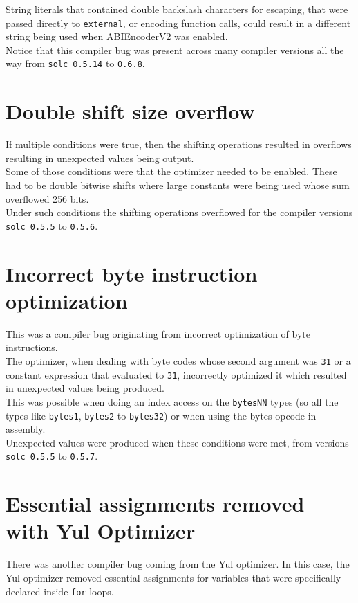 String literals that contained double backslash characters for escaping, that were passed directly to \texttt{external}, or encoding function calls, could result in a different string being used when ABIEncoderV2 was enabled. \\

Notice that this compiler bug was present across many compiler versions all the way from \texttt{solc 0.5.14} to \texttt{0.6.8}.

\section{Double shift size overflow}
If multiple conditions were true, then the shifting operations resulted in overflows resulting in unexpected values being output.\\

Some of those conditions were that the optimizer needed to be enabled. These had to be double bitwise shifts where large constants were being used whose sum overflowed 256 bits. \\

Under such conditions the shifting operations overflowed for the compiler versions \texttt{solc 0.5.5} to \texttt{0.5.6}.

\section{Incorrect byte instruction optimization}
This was a compiler bug originating from incorrect optimization of byte instructions.\\

The optimizer, when dealing with byte codes whose second argument was \texttt{31} or a constant expression that evaluated to \texttt{31}, incorrectly optimized it which resulted in unexpected values being produced. \\

This was possible when doing an index access on the \texttt{bytesNN} types (so all the types like \texttt{bytes1}, \texttt{bytes2} to \texttt{bytes32}) or when using the bytes opcode in assembly.\\

Unexpected values were produced when these conditions were met, from versions \texttt{solc 0.5.5} to \texttt{0.5.7}.

\section{Essential assignments removed with Yul Optimizer}
There was another compiler bug coming from the Yul optimizer. In this case, the Yul optimizer removed essential assignments for variables that were specifically declared inside \texttt{for} loops.\\

